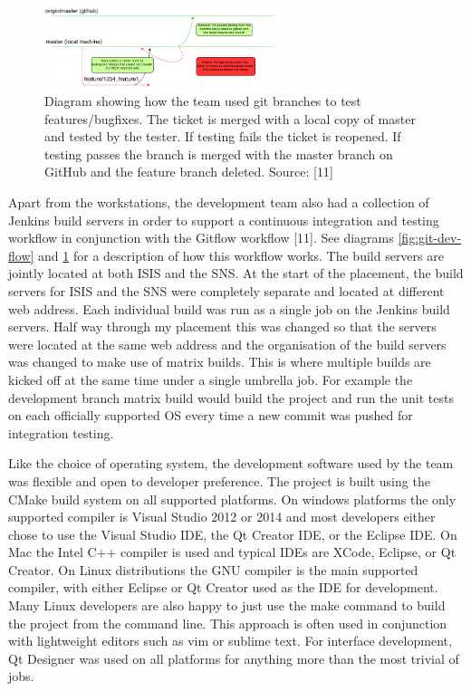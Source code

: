 \documentclass[paper=a4, fontsize=11pt]{scrartcl}	%
\numberwithin{equation}{section}															%
\numberwithin{figure}{section}																%
\numberwithin{table}{section}
\begin{document}
\begin{figure}[H]
\centering
\includegraphics[width=0.6\textwidth]{img/GitWorflow-Testing.png}
\caption{Diagram showing how the team used git branches to test features/bugfixes. The ticket is merged with a local copy of master and tested by the tester. If testing fails the ticket is reopened. If testing passes the branch is merged with the master branch on GitHub and the feature branch deleted. Source: {[}11{]}}
\label{fig:git-testing-flow}
\end{figure}

Apart from the workstations, the development team also had a collection of
Jenkins build servers in order to support a continuous integration and
testing workflow in conjunction with the Gitflow workflow {[}11{]}. See diagrams \ref{fig:git-dev-flow} and \ref{fig:git-testing-flow} for a description of how this workflow works. The
build servers are jointly located at both ISIS and the SNS. At the start
of the placement, the build servers for ISIS and the SNS were completely
separate and located at different web address. Each individual build was
run as a single job on the Jenkins build servers. Half way through my
placement this was changed so that the servers were located at the same
web address and the organisation of the build servers was changed to
make use of matrix builds. This is where multiple builds are kicked
off at the same time under a single umbrella job. For example the
development branch matrix build would build the project and run the unit
tests on each officially supported OS every time a new commit was pushed
for integration testing.

Like the choice of operating system, the development software used by
the team was flexible and open to developer preference. The project is
built using the CMake build system on all supported platforms. On
windows platforms the only supported compiler is Visual Studio 2012 or
2014 and most developers either chose to use the Visual Studio IDE, the
Qt Creator IDE, or the Eclipse IDE. On Mac the Intel C++ compiler is
used and typical IDEs are XCode, Eclipse, or Qt Creator. On Linux
distributions the GNU compiler is the main supported compiler, with
either Eclipse or Qt Creator used as the IDE for development. Many Linux
developers are also happy to just use the make command to build the
project from the command line. This approach is often used in
conjunction with lightweight editors such as vim or sublime text. For
interface development, Qt Designer was used on all platforms for
anything more than the most trivial of jobs.
\end{document}
